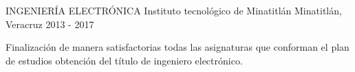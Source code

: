 


\begin{cventries}


\cventry
{INGENIERÍA ELECTRÓNICA} %
{Instituto tecnológico de Minatitlán} %
{Minatitlán, Veracruz} %
{2013 - 2017} %
{ %
\begin{cvitems}
\item {Finalización de manera satisfactorias todas las asignaturas que conforman el plan de estudios obtención del título de ingeniero electrónico.}
\end{cvitems}
}


\end{cventries}